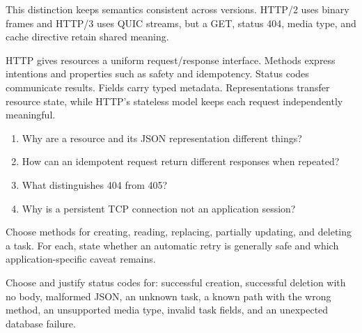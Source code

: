 This distinction keeps semantics consistent across versions. HTTP/2 uses binary
frames and HTTP/3 uses QUIC streams, but a GET, status 404, media type, and cache
directive retain shared meaning.

\summarytitle

HTTP gives resources a uniform request/response interface. Methods express
intentions and properties such as safety and idempotency. Status codes communicate
results. Fields carry typed metadata. Representations transfer resource state,
while HTTP's stateless model keeps each request independently meaningful.

\reviewtitle
\begin{enumerate}
  \item Why are a resource and its JSON representation different things?
  \item How can an idempotent request return different responses when repeated?
  \item What distinguishes 404 from 405?
  \item Why is a persistent TCP connection not an application session?
\end{enumerate}

\begin{exercise}
Choose methods for creating, reading, replacing, partially updating, and deleting
a task. For each, state whether an automatic retry is generally safe and which
application-specific caveat remains.
\end{exercise}

\begin{exercise}
Choose and justify status codes for: successful creation, successful deletion
with no body, malformed JSON, an unknown task, a known path with the wrong
method, an unsupported media type, invalid task fields, and an unexpected
database failure.
\end{exercise}
